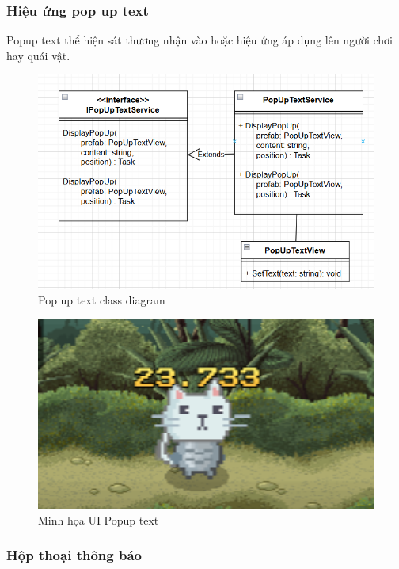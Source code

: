 \subsubsection{Hiệu ứng pop up text}

Popup text thể hiện sát thương nhận vào hoặc hiệu ứng áp dụng lên người chơi hay quái vật.

\begin{figure}[H]
	\centering
	\includegraphics[width=13cm]{Images/PopUpText.png}
	\vspace{0.5cm}
	\caption{Pop up text class diagram}
\end{figure}

\begin{figure}[H]
	\centering
	\includegraphics[width=13cm]{Images/PopupTextUI.png}
	\vspace{0.5cm}
	\caption{Minh họa UI Popup text}
\end{figure}

\subsubsection{Hộp thoại thông báo}


